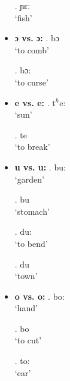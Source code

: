 \documentclass{assets/fieldnotes}
\begin{document}
\begin{itemize}
    \ex. ɲɛː\\
        `fish'

    \item \textbf{ɔ vs. ɔ:}
    \ex. bɔ\\
        `to comb'

    \ex. bɔ:\\
        `to curse'
    
    \item \textbf{e vs. e:}
    \ex. t$^h$e:\\
        `sun'

    \ex. te\\
        `to break'

    \item \textbf{u vs. u:}
    \ex. bu:\\
        `garden'

    \ex. bu\\
        `stomach'
    
    \ex. du:\\
        `to bend'

    \ex. du\\
        `town'

    \item \textbf{o vs. o:}
    \ex. bo:\\
        `hand'
        
    \ex. bo\\
        `to cut'
        
    \ex. to:\\
        `ear'

\end{itemize}
\end{document}
